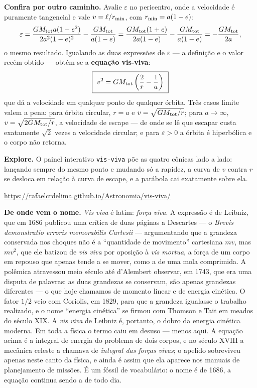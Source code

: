 \documentclass[11pt,a4paper]{article}
\begin{document}
\textbf{Confira por outro caminho.} Avalie $\varepsilon$ no pericentro, onde a velocidade é puramente
tangencial e vale $v=\ell/r_{\rm min}$, com $r_{\rm min}=a(1-e)$:
\[
\varepsilon=\frac{GM_{\rm tot}a(1-e^{2})}{2a^{2}(1-e)^{2}}-\frac{GM_{\rm tot}}{a(1-e)}
=\frac{GM_{\rm tot}(1+e)}{2a(1-e)}-\frac{GM_{\rm tot}}{a(1-e)}
=-\frac{GM_{\rm tot}}{2a},
\]
o mesmo resultado. Igualando as duas expressões de $\varepsilon$ --- a definição e o valor recém-obtido ---
obtém-se a \textbf{equação vis-viva}:
\[
\boxed{\ v^{2}=GM_{\rm tot}\left(\frac{2}{r}-\frac{1}{a}\right)\ }
\]
que dá a velocidade em qualquer ponto de qualquer órbita. Três casos limite valem a pena: para órbita
circular, $r=a$ e $v=\sqrt{GM_{\rm tot}/r}$; para $a\to\infty$, $v=\sqrt{2GM_{\rm tot}/r}$, a velocidade de
escape --- de onde se lê que escapar custa exatamente $\sqrt{2}$ vezes a velocidade circular; e para
$\varepsilon>0$ a órbita é hiperbólica e o corpo não retorna.

\begin{noticebox}
\textbf{Explore.} O painel interativo \texttt{vis-viva} põe as quatro cônicas lado a lado: lançando sempre do
mesmo ponto e mudando só a rapidez, a curva de $v$ contra $r$ se desloca em relação à curva de escape, e a
parábola cai exatamente sobre ela.
\begin{center}
\url{https://rafaelcrdelima.github.io/Astronomia/vis-viva/}
\end{center}
\end{noticebox}

\begin{noticebox}
\textbf{De onde vem o nome.} \textit{Vis viva} é latim: \emph{força viva}. A expressão é de Leibniz, que em 1686
publicou uma crítica de duas páginas a Descartes --- o \textit{Brevis demonstratio erroris memorabilis Cartesii} ---
argumentando que a grandeza conservada nos choques não é a ``quantidade de movimento'' cartesiana $mv$, mas $mv^{2}$,
que ele batizou de \textit{vis viva} por oposição à \textit{vis mortua}, a força de um corpo em repouso que apenas
tende a se mover, como a de uma mola comprimida. A polêmica atravessou meio século até d'Alembert observar, em 1743,
que era uma disputa de palavras: as duas grandezas se conservam, são apenas grandezas diferentes --- o que hoje
chamamos de momento linear e de energia cinética. O fator $1/2$ veio com Coriolis, em 1829, para que a grandeza
igualasse o trabalho realizado, e o nome ``energia cinética'' se firmou com Thomson e Tait em meados do século XIX.
A \textit{vis viva} de Leibniz é, portanto, o dobro da energia cinética moderna. Em toda a física o termo caiu em
desuso --- menos aqui. A equação acima é a integral de energia do problema de dois corpos, e no século XVIII a
mecânica celeste a chamava de \textit{integral das forças vivas}; o apelido sobreviveu apenas neste canto da física,
e ainda é assim que ela aparece nos manuais de planejamento de missões. É um fóssil de vocabulário: o nome é de 1686,
a equação continua sendo a de todo dia.
\end{noticebox}
\end{document}
